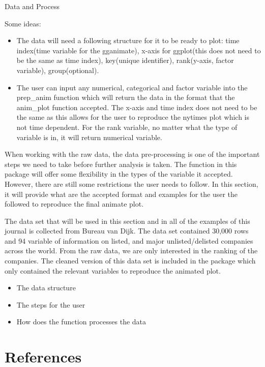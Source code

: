 Data and Process

Some ideas:

\begin{itemize}
\item
  The data will need a following structure for it to be ready to plot: time index(time variable for the gganimate), x-axis for ggplot(this does not need to be the same as time index), key(unique identifier), rank(y-axis, factor variable), group(optional).
\item
  The user can input any numerical, categorical and factor variable into the prep\_anim function which will return the data in the format that the anim\_plot function accepted. The x-axis and time index does not need to be the same as this allows for the user to reproduce the nytimes plot which is not time dependent. For the rank variable, no matter what the type of variable is in, it will return numerical variable.
\end{itemize}

When working with the raw data, the data pre-processing is one of the important steps we need to take before further analysis is taken. The function in this package will offer some flexibility in the types of the variable it accepted. However, there are still some restrictions the user needs to follow. In this section, it will provide what are the accepted format and examples for the user the followed to reproduce the final animate plot.

The data set that will be used in this section and in all of the examples of this journal is collected from Bureau van Dijk. The data set contained 30,000 rows and 94 variable of information on listed, and major unlisted/delisted companies across the world. From the raw data, we are only interested in the ranking of the companies. The cleaned version of this data set is included in the package which only contained the relevant variables to reproduce the animated plot.

\begin{itemize}
\tightlist
\item
  The data structure
\item
  The steps for the user
\item
  How does the function processes the data
\end{itemize}

\hypertarget{references}{%
\section*{References}\label{references}}

